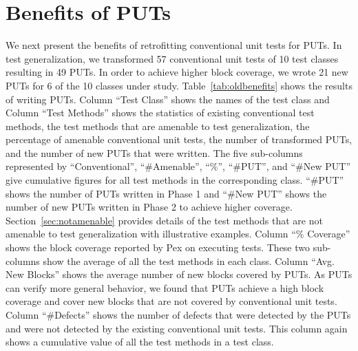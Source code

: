 \section{Benefits of PUTs}
\label{sec:newbenefits}
We next present the benefits of retrofitting conventional unit tests for PUTs. 
In test generalization, we transformed 57 conventional unit tests of 10 test classes resulting in 49 PUTs.  In order to achieve higher block coverage, we wrote 21 new PUTs for 6 of the 10 classes under study. Table~\ref{tab:oldbenefits} shows the results of writing PUTs. Column ``Test Class'' shows the names of the test class and Column ``Test Methods'' shows the statistics of existing 
conventional test methods, the test methods that are amenable to 
test generalization, the percentage of amenable conventional unit tests, the number of transformed PUTs, and the number of new PUTs that were written. The five sub-columns 
represented by ``Conventional'', ``\#Amenable'', ``\%'', ``\#PUT'', and ``\#New PUT'' give cumulative figures for all test methods in the corresponding class. ``\#PUT'' shows the number of PUTs written in Phase 1 and ``\#New PUT'' shows the number of new PUTs written in Phase 2 to achieve higher coverage. Section~\ref{sec:notamenable} provides details of the test methods that are not amenable to test generalization with illustrative examples. 
Column ``\% Coverage'' shows the block coverage reported by Pex on executing
tests. These two sub-columns show the average of all the test methods in each class. Column ``Avg. New Blocks'' 
shows the average number of new blocks covered by PUTs. As PUTs can verify more general behavior,
we found that PUTs achieve a high block coverage and cover new blocks
that are not covered by conventional unit tests. Column ``\#Defects'' shows the number of defects that were detected by the PUTs 
and were not detected by the existing conventional unit tests. 
This column again shows a cumulative value of all the test methods in a test class.
\setlength{\tabcolsep}{2pt}
